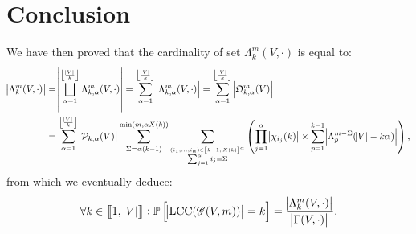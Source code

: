 \documentclass{article}
\theoremstyle{definition}
\theoremstyle{remark}
\DeclareMathOperator{\LCC}{LCC}
\renewcommand{\P}{\mathbb P}
\newcommand{\intint}[2]{\left\llbracket#1, \, #2\right\rrbracket}
\newcommand{\floor}[1]{\left\lfloor#1\right\rfloor}
\begin{document}
\section{Conclusion}
	We have then proved that the cardinality of set $\Lambda_k^m(V, \cdot)$ is equal to:
	\begin{align*}
		\abs {\Lambda_k^m(V, \cdot)} &= \abs {\bigsqcup_{\alpha=1}^{\floor {\frac {\abs V}k}}\Lambda_{k,\alpha}^m(V, \cdot)}
			= \sum_{\alpha=1}^{\floor {\frac {\abs V}k}}\abs {\Lambda_{k,\alpha}^m(V, \cdot)} = \sum_{\alpha=1}^{\floor {\frac {\abs V}k}}\abs {\mathfrak Q_{k,\alpha}^m(V)} \\
		&= \sum_{\alpha=1}^{\floor {\frac {\abs V}k}}\abs {\mathcal P_{k,\alpha}(V)}\sum_{\Sigma=\alpha(k-1)}^{\min(m, \alpha X(k))}
			\sum_{\stackrel {(i_1, \ldots, i_\alpha) \in \intint {k-1}{X(k)}^\alpha}{\sum_{j=1}^\alpha i_j = \Sigma}}
			\left(\prod_{j=1}^\alpha\abs {\chi_{i_j}(k)} \times \sum_{p=1}^{k-1}\abs {\Lambda_p^{m-\Sigma}(\abs V-k\alpha)}\right),
	\end{align*}
	from which we eventually deduce:
	\[\forall k \in \intint 1{\abs V} : \P\left[\abs {\LCC(\mathscr G(V, m))} = k\right] = \frac {\abs {\Lambda_k^m(V, \cdot)}}{\abs {\Gamma(V, \cdot)}}.\]
\end{document}

